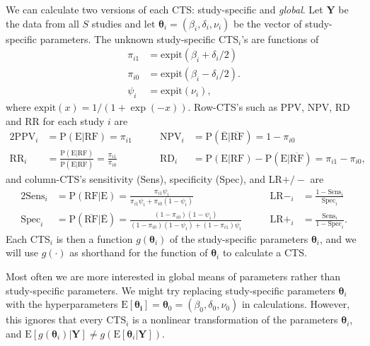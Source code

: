 \documentclass[AMA,STIX1COL]{WileyNJD-v2}
\newcommand{\E}{\mbox{E}}
\newcommand{\RF}{\mbox{RF}}
\newcommand{\Ebar}{\overline{\mbox{E}}}
\newcommand{\RFbar}{\overline{\mbox{RF}}}
\newcommand{\boldtheta}{\boldsymbol{\theta}}
\begin{document}
We can calculate two versions of each CTS: study-specific and \textit{global}. Let $\boldsymbol{Y}$ be the data from all $S$ studies and let $\boldtheta_i = (\beta_i, \delta_i, \nu_i)$ be the vector of study-specific parameters. The unknown study-specific CTS$_i$'s are functions of
\begin{align}
\pi_{i1} &= \mbox{expit}(\beta_i + \delta_i / 2) \nonumber \\
\pi_{i0} &= \mbox{expit}(\beta_i - \delta_i / 2). \nonumber \\
\psi_i &= \mbox{expit}(\nu_i), \nonumber
\end{align}
where $\mbox{expit}(x) = 1 / (1 + \exp(-x))$. Row-CTS's such as PPV, NPV, RD and RR for each study $i$ are
\begin{alignat}{2}
\mbox{PPV}_i &= \mbox{P}(\E \vert \RF) = \pi_{i1}   \qquad &\mbox{NPV}_i &= \mbox{P}(\Ebar \vert \RFbar) = 1 - \pi_{i0} \nonumber \\
\mbox{RR}_i &= \frac{\mbox{P}(\E \vert \RF)}{\mbox{P}(\E \vert \RFbar)} = \frac{\pi_{i1}}{\pi_{i0}}  \qquad &\mbox{RD}_i &= \mbox{P}(\E \vert \RF) - \mbox{P}(\E \vert \RFbar) = \pi_{i1} - \pi_{i0} , \nonumber
\end{alignat}
\noindent and column-CTS's sensitivity (Sens), specificity (Spec), and LR$+/-$ are
\begin{alignat}{2}
\mbox{Sens}_i &= \mbox{P}(\RF \vert \E) = \frac{\pi_{i1} \psi_i}{\pi_{i1}\psi_i + \pi_{i0}(1 - \psi_i)} \qquad &  \mbox{LR}-_i &= \frac{1 - \mbox{Sens}_i}{\mbox{Spec}_i} \nonumber \\
\mbox{Spec}_i &= \mbox{P}(\RFbar \vert \Ebar) = \frac{(1 - \pi_{i0})(1 - \psi_i)}{(1 - \pi_{i0}) (1 - \psi_i) + (1 - \pi_{i1}) \psi_i} \qquad & \mbox{LR}+_i &= \frac{\mbox{Sens}_i}{1 - \mbox{Spec}_i}.\nonumber  \nonumber
\end{alignat}
\noindent Each CTS$_i$ is then a function $g(\boldtheta_i)$ of the study-specific parameters $\boldtheta_i$, and we will use $g(\cdot)$ as shorthand for the function of $\boldtheta_i$ to calculate a CTS. 

Most often we are more interested in global means of parameters rather than study-specific parameters. We might try replacing study-specific parameters $\boldtheta_i$ with the hyperparameters $\E[\boldsymbol{\theta_i}] = \boldtheta_0 = (\beta_0, \delta_0, \nu_0)$ in calculations. However, this ignores that every CTS$_i$ is a nonlinear transformation of the parameters $\boldtheta_i$, and $\E[g(\boldtheta_i) \vert \boldsymbol{Y}] \ne g(\E[\boldtheta_i \vert \boldsymbol{Y}])$.
\end{document}
